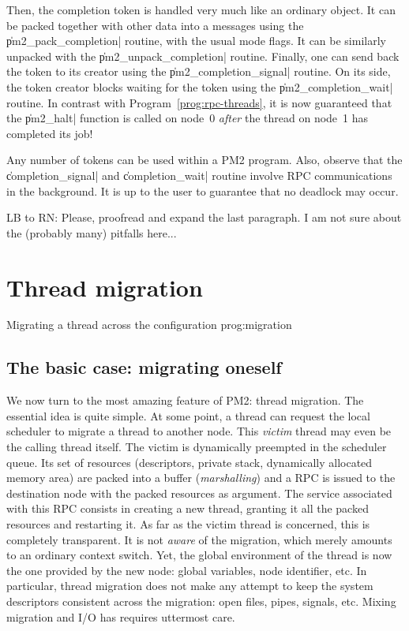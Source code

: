 Then, the completion token is handled very much like an ordinary
object. It can be packed together with other data into a messages
using the \|pm2_pack_completion| routine, with the usual mode flags.
It can be similarly unpacked with the \|pm2_unpack_completion|
routine.  Finally, one can send back the token to its creator using
the \|pm2_completion_signal| routine. On its side, the token creator
blocks waiting for the token using the \|pm2_completion_wait|
routine. In contrast with Program~\ref{prog:rpc-threads}, it is now
guaranteed that the \|pm2_halt| function is called on node~0
\emph{after} the thread on node~1 has completed its job!

Any number of tokens can be used within a PM2 program. Also, observe
that the \|completion_signal| and \|completion_wait| routine involve
RPC communications in the background. It is up to the user to
guarantee that no deadlock may occur.

\begin{note}
  LB to RN: Please, proofread and expand the last paragraph. I am not
  sure about the (probably many) pitfalls here...
\end{note}

\section{Thread migration}

 {Migrating a thread across the
  configuration} {prog:migration}

\subsection{The basic case: migrating oneself}
\label{sec:self-migration}

We now turn to the most amazing feature of PM2: thread migration. The
essential idea is quite simple. At some point, a thread can request
the local scheduler to migrate a thread to another node. This
\emph{victim} thread may even be the calling thread itself. The victim
is dynamically preempted in the scheduler queue. Its set of resources
(descriptors, private stack, dynamically allocated memory area) are
packed into a buffer (\emph{marshalling}) and a RPC is issued to the
destination node with the packed resources as argument.  The service
associated with this RPC consists in creating a new thread, granting
it all the packed resources and restarting it.  As far as the victim
thread is concerned, this is completely transparent.  It is not
\emph{aware} of the migration, which merely amounts to an ordinary
context switch.  Yet, the global environment of the thread is now the
one provided by the new node: global variables, node identifier, etc.
In particular, thread migration does not make any attempt to keep the
system descriptors consistent across the migration: open files, pipes,
signals, etc.  Mixing migration and I/O has requires uttermost care.

